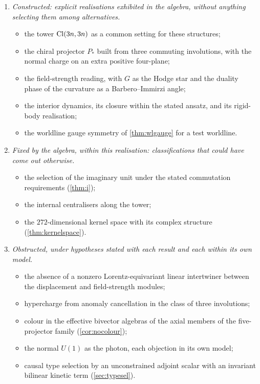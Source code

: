 \begin{enumerate}[label=(\roman*),leftmargin=2.2em]
\begin{itemize}
  \end{itemize}
Centraliser computations are standard methods; their results along the tower are statements about this realisation and appear in (iii).
\item \emph{Constructed: explicit realisations exhibited in the algebra, without anything selecting them among alternatives.}
  \begin{itemize}
  \item the tower $\mathrm{Cl}(3n,3n)$ as a common setting for these structures;
  \item the chiral projector $P_*$ built from three commuting involutions, with the normal charge on an extra positive four-plane;
  \item the field-strength reading, with $G$ as the Hodge star and the duality phase of the curvature as a Barbero--Immirzi angle;
  \item the interior dynamics, its closure within the stated ansatz, and its rigid-body realisation;
  \item the worldline gauge symmetry of \cref{thm:wlgauge} for a test worldline.
  \end{itemize}
\item \emph{Fixed by the algebra, within this realisation: classifications that could have come out otherwise.}
  \begin{itemize}
  \item the selection of the imaginary unit under the stated commutation requirements (\cref{thm:i});
  \item the internal centralisers along the tower;
  \item the $272$-dimensional kernel space with its complex structure (\cref{thm:kernelspace}).
  \end{itemize}
\item \emph{Obstructed, under hypotheses stated with each result and each within its own model.}
  \begin{itemize}
  \item the absence of a nonzero Lorentz-equivariant linear intertwiner between the displacement and field-strength modules;
  \item hypercharge from anomaly cancellation in the class of three involutions;
  \item colour in the effective bivector algebras of the axial members of the five-projector family (\cref{cor:nocolour});
  \item the normal $U(1)$ as the photon, each objection in its own model;
  \item causal type selection by an unconstrained adjoint scalar with an invariant bilinear kinetic term (\cref{sec:typesel}).

\end{itemize}
\end{enumerate}
